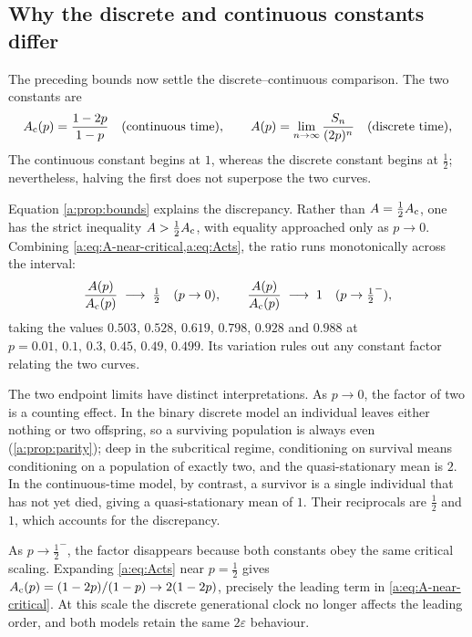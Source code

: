 \subsection{Why the discrete and continuous constants differ}
\label{a:sec:compare}

The preceding bounds now settle the discrete--continuous comparison.  The two
constants are
\begin{equation*}
A_{\mathrm{c}}(p) = \frac{1-2p}{1-p}\quad\text{(continuous time)},
\qquad
A(p) = \lim_{n\to\infty}\frac{S_n}{(2p)^n}\quad\text{(discrete time)},
\end{equation*}
The continuous constant begins at $1$, whereas the discrete constant begins at
$\tfrac12$; nevertheless, halving the first does not superpose the two curves.

Equation \cref{a:prop:bounds} explains the discrepancy.  Rather than
$A=\tfrac12A_{\mathrm{c}}$, one has the strict inequality $A>\tfrac12A_{\mathrm{c}}$, with equality
approached only as $p\to0$.  Combining
\cref{a:eq:A-near-critical,a:eq:Acts}, the ratio runs monotonically across the
interval:
\begin{equation}
\label{a:eq:ratiolimits}
\frac{A(p)}{A_{\mathrm{c}}(p)} \;\longrightarrow\; \tfrac12 \quad(p\to0),
\qquad
\frac{A(p)}{A_{\mathrm{c}}(p)} \;\longrightarrow\; 1 \quad(p\to\tfrac12^-),
\end{equation}
taking the values $0.503$, $0.528$, $0.619$, $0.798$, $0.928$ and $0.988$ at
$p=0.01,\,0.1,\,0.3,\,0.45,\,0.49,\,0.499$.  Its variation rules out any constant
factor relating the two curves.

The two endpoint limits have distinct interpretations.  As $p\to0$, the factor of
two is a counting effect.  In the binary discrete model an
individual leaves either nothing or two offspring, so a surviving population is
always even (\cref{a:prop:parity}); deep in the subcritical regime, conditioning on
survival means conditioning on a population of exactly two, and the
quasi-stationary mean is $2$.  In the continuous-time model, by contrast, a
survivor is a single individual that has not yet died, giving a quasi-stationary
mean of $1$.  Their reciprocals are $\tfrac12$ and $1$, which accounts for the
discrepancy.

As $p\to\tfrac12^-$, the factor disappears because both constants obey the same
critical scaling.  Expanding \cref{a:eq:Acts} near $p=\tfrac12$ gives
$A_{\mathrm{c}}(p)=(1-2p)/(1-p)\to2(1-2p)$, precisely the leading term in
\cref{a:eq:A-near-critical}.  At this scale the discrete generational clock no
longer affects the leading order, and both models retain the same
$2\varepsilon$ behaviour.

